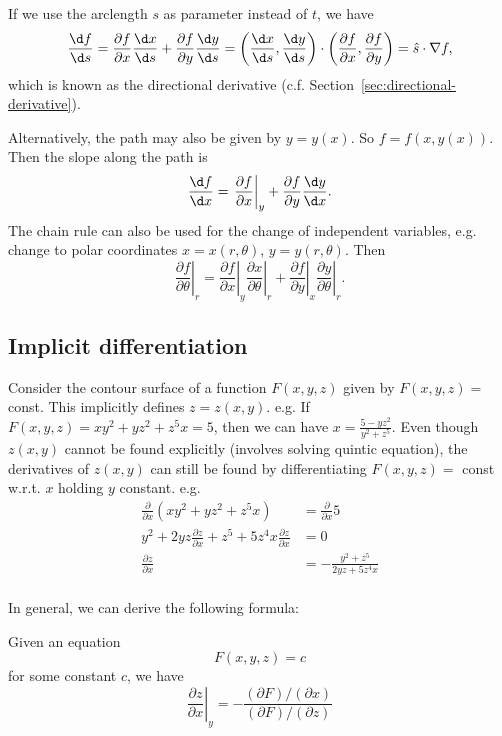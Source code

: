 \documentclass[a4paper]{article}
\begin{document}
If we use the arclength $s$ as parameter instead of $t$, we have 
\[
\frac{\d f}{\d s} = \frac{\partial f}{\partial x}\frac{\d x}{\d s} + \frac{\partial f}{\partial y}\frac{\d y}{\d s} = \left(\frac{\d x}{\d s}, \frac{\d y}{\d s}\right)\cdot \left(\frac{\partial f}{\partial x}, \frac{\partial f}{\partial y}\right) = \hat{s}\cdot \nabla f,
\]
which is known as the directional derivative (c.f. Section~\ref{sec:directional-derivative}).

Alternatively, the path may also be given by $y = y(x)$. So $f = f(x, y(x))$. Then the slope along the path is
\[
\frac{\d f}{\d x} = \left.\frac{\partial f}{\partial x}\right|_y + \frac{\partial f}{\partial y}{\frac{\d y}{\d x}}.
\]
The chain rule can also be used for the change of independent variables, e.g. change to polar coordinates $x = x(r, \theta)$, $y = y(r, \theta)$. Then 
\[
\left.\frac{\partial f}{\partial \theta}\right|_r = \left. \frac{\partial f}{\partial x}\right|_y \left.\frac{\partial x}{\partial \theta}\right|_r + \left.\frac{\partial f}{\partial y}\right|_x\left.\frac{\partial y}{\partial \theta}\right|_r.
\]
\subsection{Implicit differentiation}
Consider the contour surface of a function $F(x, y, z)$ given by $F(x, y, z) = $ const. This implicitly defines $z = z(x, y)$. e.g. If $F(x, y, z) = xy^2 + yz^2 + z^5x = 5$, then we can have $x = \frac{5 - yz^2}{y^2 + z^5}$. Even though $z(x, y)$ cannot be found explicitly (involves solving quintic equation), the derivatives of $z(x, y)$ can still be found by differentiating $F(x, y, z) =$ const w.r.t. $x$ holding $y$ constant. e.g.
\begin{align*}
  \frac{\partial }{\partial x}(xy^2 + yz^2 + z^5x) &= \frac{\partial }{\partial x}5\\
  y^2 + 2yz\frac{\partial z}{\partial x} + z^5 + 5z^4x\frac{\partial z}{\partial x} &= 0\\
  \frac{\partial z}{\partial x} &= -\frac{y^2 + z^5}{2yz + 5z^4x}\\
\end{align*}

In general, we can derive the following formula:
\begin{thm} Given an equation 
  \[
  F(x, y, z) = c
  \]
  for some constant $c$, we have
  \[
  \left.\frac{\partial z}{\partial x}\right|_y = -\frac{(\partial F)/(\partial x)}{(\partial F)/(\partial z)}
  \]
\end{thm}
\end{document}
